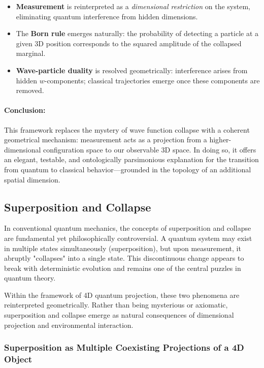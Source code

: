 \documentclass[12pt]{article}
\begin{document}
\begin{itemize}
  \item \textbf{Measurement} is reinterpreted as a \emph{dimensional restriction} on the system, eliminating quantum interference from hidden dimensions.
  \item The \textbf{Born rule} emerges naturally: the probability of detecting a particle at a given 3D position corresponds to the squared amplitude of the collapsed marginal.
  \item \textbf{Wave-particle duality} is resolved geometrically: interference arises from hidden \( w \)-components; classical trajectories emerge once these components are removed.
\end{itemize}

\paragraph{Conclusion:}

This framework replaces the mystery of wave function collapse with a coherent geometrical mechanism: measurement acts as a projection from a higher-dimensional configuration space to our observable 3D space. In doing so, it offers an elegant, testable, and ontologically parsimonious explanation for the transition from quantum to classical behavior—grounded in the topology of an additional spatial dimension.

\subsection{Superposition and Collapse}

In conventional quantum mechanics, the concepts of superposition and collapse are fundamental yet philosophically controversial. A quantum system may exist in multiple states simultaneously (superposition), but upon measurement, it abruptly "collapses" into a single state. This discontinuous change appears to break with deterministic evolution and remains one of the central puzzles in quantum theory.

Within the framework of 4D quantum projection, these two phenomena are reinterpreted geometrically. Rather than being mysterious or axiomatic, superposition and collapse emerge as natural consequences of dimensional projection and environmental interaction.

\subsubsection{Superposition as Multiple Coexisting Projections of a 4D Object}
\end{document}
